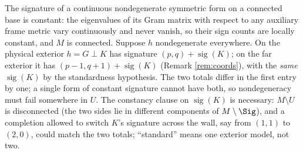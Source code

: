 The signature of a continuous nondegenerate symmetric form on a connected base is constant: the eigenvalues of its Gram matrix with respect to any auxiliary frame metric vary continuously and never vanish, so their sign counts are locally constant, and $M$ is connected. Suppose $h$ nondegenerate everywhere. On the physical exterior $h = G \perp K$ has signature $(p,q) + \operatorname{sig}(K)$; on the far exterior it has $(p{-}1, q{+}1) + \operatorname{sig}(K)$ (Remark \ref{rem:coords}), with the \emph{same} $\operatorname{sig}(K)$ by the standardness hypothesis. The two totals differ in the first entry by one; a single form of constant signature cannot have both, so nondegeneracy must fail somewhere in $U$. The constancy clause on $\operatorname{sig}(K)$ is necessary: $M \setminus U$ is disconnected (the two sides lie in different components of $M \setminus \Sig$), and a completion allowed to switch $K$'s signature across the wall, say from $(1,1)$ to $(2,0)$, could match the two totals; ``standard'' means one exterior model, not two.
